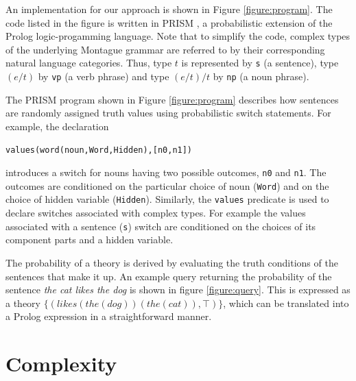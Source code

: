 \documentclass[11pt]{article}
\theoremstyle{definition}
\newcommand{\hide}[1]{}
\begin{document}
An implementation for our approach is shown in Figure 
\ref{figure:program}. The code listed in the figure is written in PRISM \cite{Sato:97}, a probabilistic extension of the Prolog logic-progamming language. Note that to simplify the code, complex types of the underlying Montague grammar are referred to by their corresponding natural language
categories. Thus, type $t$ is represented by \texttt{s} (a sentence), type $(e/t)$ by \texttt{vp} (a verb phrase) and type $(e/t)/t$ by \texttt{np} (a noun phrase). 
\hide{
The PRISM language augments Prolog with probabilistic predicates and declarations. In particular, it incorporates random switches. The predicate \texttt{values} is used to declare a named switch and associate with it a number of possible outcomes while the probabilistic predicate \texttt{msw} allows a random choice to made amongst these outcomes during execution. 
}
The PRISM program shown in Figure \ref{figure:program} describes how sentences are randomly assigned truth values using probabilistic switch statements. For example, the declaration 
\begin{center}
\texttt{values(word(noun,Word,Hidden),[n0,n1])} 
\end{center}
introduces a switch for nouns having two possible outcomes, \texttt{n0} and \texttt{n1}.
The outcomes are conditioned on the particular choice of noun (\texttt{Word}) and on the choice of hidden variable (\texttt{Hidden}). Similarly, the \texttt{values} predicate is used to declare switches associated with complex types. For example the values associated with a sentence (\texttt{s}) switch are conditioned on the choices of its component parts and a hidden variable.

The probability of a theory is derived by evaluating the truth
conditions of the sentences that make it up.\hide{Note that probability
distributions are defined over models, not theories, so that to
evaluate the probability of a theory it is necessary to sum over the
probabilities of all of its satisfying models. To achieve this, the
predicate \texttt{prob} is used.} An example query returning the
probability of the sentence {\em the cat likes the dog\/} is shown in
figure \ref{figure:query}. This is expressed as a theory
$\{(\mathit{likes}(\mathit{the}(\mathit{dog}))(\mathit{the}(\mathit{cat})),\top)\}$,
which can be translated into a Prolog expression in a straightforward
manner.


\section{Complexity}
\end{document}
